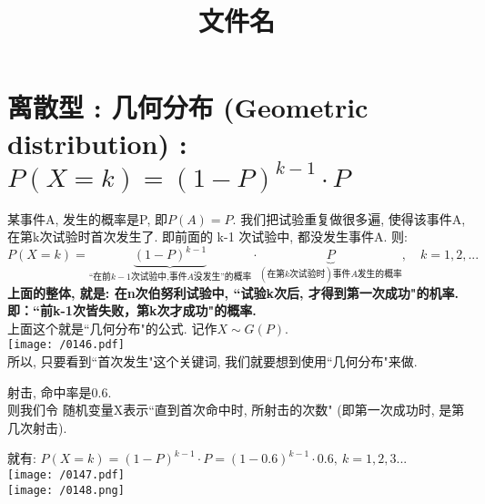 \documentclass[UTF8]{ctexart}
\title{文件名}
\begin{document}
	\tableofcontents %
	\date{} %
	\maketitle  %
	


	\section{离散型 : 几何分布 (Geometric distribution) :  \\ $	P\left( X=k \right) =\left( 1-P \right) ^{k-1}\cdot P$}
	
	某事件A, 发生的概率是P,  即$ P(A)=P$.  我们把试验重复做很多遍, 使得该事件A, 在第k次试验时首次发生了. 即前面的 k-1 次试验中, 都没发生事件A. 则: \\
	
	$	\boxed{
	P\left( X=k \right) =\underset{\text{在前}k-1\text{次试验中,事件}A\text{没发生}\text{的概率}}{\underbrace{\left( 1-P \right) ^{k-1}}}\cdot \underset{(\text{在第}k\text{次试验时})\text{事件}A\text{发生的概率}}{\underbrace{P}} , \quad k=1,2,...
	}$ \\

	\textbf{上面的整体, 就是: 在n次伯努利试验中, ``试验k次后, 才得到第一次成功"的机率. 即：``前k-1次皆失败，第k次才成功"的概率.} \\
	上面这个就是``几何分布"的公式. 记作$X \sim G(P)$. \\
	
	\texttt{[image: /0146.pdf]} \\
	
	
	
	所以, 只要看到``首次发生"这个关键词, 我们就要想到使用``几何分布"来做. \\
	
	\begin{myEnvSample}
		射击, 命中率是0.6. \\
		则我们令 随机变量X表示``直到首次命中时, 所射击的次数" (即第一次成功时, 是第几次射击). 
		
		就有: $
		P\left( X=k \right) =\left( 1-P \right) ^{k-1}\cdot P=\left( 1-0.6 \right) ^{k-1}\cdot 0.6,\ k=1,2,3...
		$ \\
		
		\texttt{[image: /0147.pdf]} \\
		
		\texttt{[image: /0148.png]} \\
	\end{myEnvSample}
	
\end{document}
